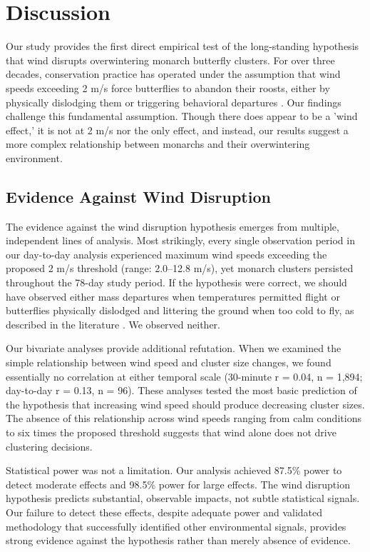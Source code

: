 \section{Discussion}

Our study provides the first direct empirical test of the long-standing hypothesis that wind disrupts overwintering monarch butterfly clusters. For over three decades, conservation practice has operated under the assumption that wind speeds exceeding 2 m/s force butterflies to abandon their roosts, either by physically dislodging them or triggering behavioral departures \parencite{leongEvaluationManagementCalifornia2016}. Our findings challenge this fundamental assumption. Though there does appear to be a 'wind effect,' it is not at 2 m/s nor the only effect, and instead, our results suggest a more complex relationship between monarchs and their overwintering environment.

\subsection{Evidence Against Wind Disruption}

The evidence against the wind disruption hypothesis emerges from multiple, independent lines of analysis. Most strikingly, every single observation period in our day-to-day analysis experienced maximum wind speeds exceeding the proposed 2 m/s threshold (range: 2.0--12.8 m/s), yet monarch clusters persisted throughout the 78-day study period. If the hypothesis were correct, we should have observed either mass departures when temperatures permitted flight or butterflies physically dislodged and littering the ground when too cold to fly, as described in the literature \parencite{leongRestorationOverwinteringGrove1999}. We observed neither.

Our bivariate analyses provide additional refutation. When we examined the simple relationship between wind speed and cluster size changes, we found essentially no correlation at either temporal scale (30-minute r = 0.04, n = 1,894; day-to-day r = 0.13, n = 96). These analyses tested the most basic prediction of the hypothesis that increasing wind speed should produce decreasing cluster sizes. The absence of this relationship across wind speeds ranging from calm conditions to six times the proposed threshold suggests that wind alone does not drive clustering decisions.

Statistical power was not a limitation. Our analysis achieved 87.5\% power to detect moderate effects and 98.5\% power for large effects. The wind disruption hypothesis predicts substantial, observable impacts, not subtle statistical signals. Our failure to detect these effects, despite adequate power and validated methodology that successfully identified other environmental signals, provides strong evidence against the hypothesis rather than merely absence of evidence.

